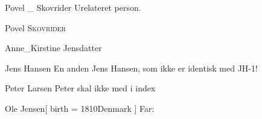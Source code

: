 \documentclass[
	twocolumn
]{article}
\begin{document}
\begin{gprProfile}{Povel _ Skovrider}
	Urelateret person.
	
	\gprStyledName{}
	
	{\gprGivenName{} {\scshape \gprByname{}}}
	
	{Povel {\scshape Skovrider}}

\end{gprProfile}

\begin{gprProfile}{Anne_Kirstine Jensdatter}
	\gprGivenName{}

\end{gprProfile}

\begin{gprProfile}{Jens Hansen}
	En anden Jens Hansen, som ikke er identisk med JH-1!
\end{gprProfile}

\begin{gprProfile}[no index]{Peter Larsen}
	Peter skal ikke med i index
\end{gprProfile}



\begin{gprProfile}{Ole Jensen}[
	birth = {1810}{Denmark}
]
	Far:
\end{gprProfile}

\printindex[gpr-id]
\end{document}
